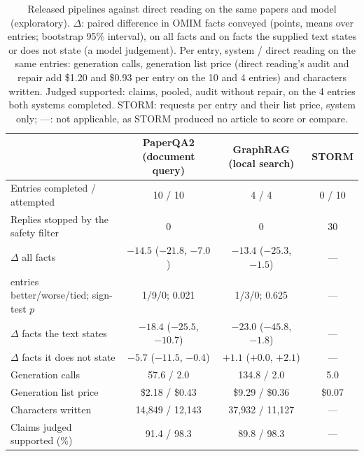 \documentclass{article} %
\begin{document}
\begin{table}[!htbp]
\caption{Released pipelines against direct reading on the same papers and model (exploratory). $\Delta$: paired difference in OMIM facts conveyed (points, means over entries; bootstrap 95\% interval), on all facts and on facts the supplied text states or does not state (a model judgement). Per entry, system / direct reading on the same entries: generation calls, generation list price (direct reading's audit and repair add \$1.20 and \$0.93 per entry on the 10 and 4 entries) and characters written. Judged supported: claims, pooled, audit without repair, on the 4 entries both systems completed. STORM: requests per entry and their list price, system only; ---: not applicable, as STORM produced no article to score or compare.}
\label{tab:released}
\begin{center}
\footnotesize
\setlength{\tabcolsep}{4pt}
\begin{tabular}{@{}lccc@{}}
\toprule
 & PaperQA2 (document query) & GraphRAG (local search) & STORM \\
\midrule
Entries completed / attempted & 10 / 10 & 4 / 4 & 0 / 10 \\
Replies stopped by the safety filter & 0 & 0 & 30 \\
$\Delta$ all facts & $-14.5$ ($-21.8$, $-7.0$) & $-13.4$ ($-25.3$, $-1.5$) & --- \\
\quad entries better/worse/tied; sign-test $p$ & 1/9/0; 0.021 & 1/3/0; 0.625 & --- \\
$\Delta$ facts the text states & $-18.4$ ($-25.5$, $-10.7$) & $-23.0$ ($-45.8$, $-1.8$) & --- \\
$\Delta$ facts it does not state & $-5.7$ ($-11.5$, $-0.4$) & $+1.1$ ($+0.0$, $+2.1$) & --- \\
Generation calls & 57.6 / 2.0 & 134.8 / 2.0 & 5.0 \\
Generation list price & \$2.18 / \$0.43 & \$9.29 / \$0.36 & \$0.07 \\
Characters written & 14,849 / 12,143 & 37,932 / 11,127 & --- \\
Claims judged supported (\%) & 91.4 / 98.3 & 89.8 / 98.3 & --- \\
\bottomrule
\end{tabular}
\end{center}
\end{table}
\end{document}
